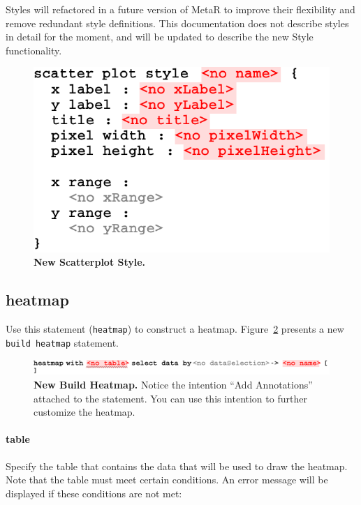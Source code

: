 \begin{remark}
Styles will refactored in a future version of MetaR to improve their flexibility and remove redundant style definitions. This documentation does not describe styles in detail for the moment, and will be updated to describe the new Style functionality. 
\end{remark}


\begin{figure}
  \centering
  \includegraphics[width=\figWidthNarrow]{figures/NewScatterPlotStyle.pdf}
\caption[New Scatterplot Style.]{\textbf{New Scatterplot Style.}}
\label{fig:NewScatterPlotStyle}
\end{figure}


\subsection{heatmap}
Use this statement (\texttt{heatmap}) to construct a heatmap. Figure~\ref{fig:NewBuildHeatmap} presents a new \texttt{build heatmap} statement.

\begin{figure}[h~tbp]
  \centering
  \includegraphics[width=\figWidthWide]{figures/NewBuildHeatmap.pdf}
\caption[New Build Heatmap.]{\textbf{New Build Heatmap.} Notice the intention ``Add Annotations'' attached to the statement. You can use this intention to further customize the heatmap.}
\label{fig:NewBuildHeatmap}
\end{figure}

\paragraph{table}
Specify the table that contains the data that will be used to draw the heatmap. Note that the table must meet certain conditions. An error message will be displayed if these conditions are not met:

